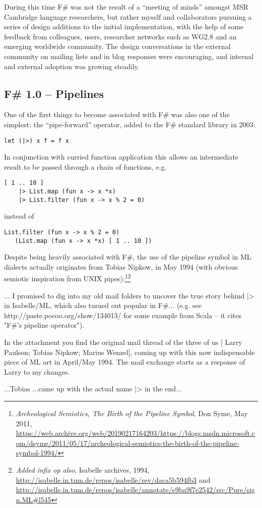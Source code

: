 \documentclass[acmsmall,review]{acmart}\settopmatter{printfolios=true,printccs=false,printacmref=false}
\begin{document}
During this time F\# was not the result of a “meeting of minds” amongst MSR Cambridge language researchers, but rather myself and collaborators pursuing a series of design additions to the initial implementation, with the help of some feedback from colleagues, users, researcher networks such as WG2.8 and an emerging worldwide community.  The design conversations in the external community on mailing lists and in blog responses were encouraging, and internal and external adoption was growing steadily. 
\subsection*{F\# 1.0 – Pipelines}

One of the first things to become associated with F\# was also one of the simplest: the “pipe-forward” operator, added to the F\# standard library in 2003:
\begin{verbatim}
let (|>) x f = f x
\end{verbatim}
In conjunction with curried function application this allows an intermediate result to be passed through a chain of functions, e.g.
\begin{verbatim}
[ 1 .. 10 ] 
    |> List.map (fun x -> x *x) 
    |> List.filter (fun x -> x % 2 = 0)
\end{verbatim}
instead of 
\begin{verbatim}
List.filter (fun x -> x % 2 = 0) 
   (List.map (fun x -> x *x) [ 1 .. 10 ])
\end{verbatim}
Despite being heavily associated with F\#, the use of the pipeline symbol in ML dialects actually originates from Tobias Nipkow, in May 1994 (with obvious semiotic inspiration from UNIX pipes):\footnote{\textit{Archeological Semiotics, The Birth of the Pipeline Symbol}, Don Syme, May 2011, \url{https://web.archive.org/web/20190217164203/https://blogs.msdn.microsoft.com/dsyme/2011/05/17/archeological-semiotics-the-birth-of-the-pipeline-symbol-1994/}}\footnote{\textit{Added infix op also}, Isabelle archives, 1994, \url{http://isabelle.in.tum.de/repos/isabelle/rev/daca5b594fb3} and \url{http://isabelle.in.tum.de/repos/isabelle/annotate/e9ba9f7e2542/src/Pure/sign.ML\#l545}}
\begin{verbquote}
... I promised to dig into my old mail folders to uncover the true story behind |> in Isabelle/ML, which also turned out popular in F\#... (e.g. see http://paste.pocoo.org/show/134013/ for some example from Scala -- it cites "F\#'s pipeline operator"). 

In the attachment you find the original mail thread of the three of us [ Larry Paulson; Tobias Nipkow; Marius Wenzel], coming up with this now indispensable piece of ML art in April/May 1994. The mail exchange starts as a response of Larry to my changes.  

...Tobias ...came up with the actual name |> in the end...
\end{verbquote}
\end{document}
